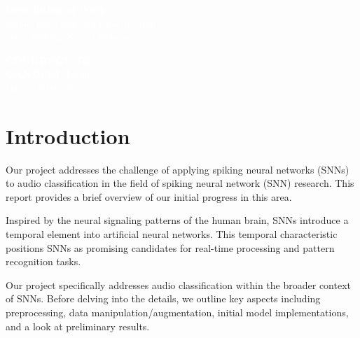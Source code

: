 \documentclass[11pt]{article}
\begin{document}
\pagecolor{darkbluegrey}
\afterpage{\nopagecolor}


\begin{titlepage}
    \begin{center}
        \textcolor{white}{\textbf{\Huge Description of Work}}\\ %
        \vspace{1cm}
        \textcolor{white}{\Large Sound Detection and Classification\\using Spiking Neural Networks} %
        \vspace{3cm}
    \end{center}
    \begin{center}
        \textcolor{white}{ %
            \textbf{COURREGE Téo}\\
            \textbf{GANDEEL Lo'aï}\\
            \vspace{1cm}
            \Large Date: \today}
    \end{center}
\end{titlepage}

\newpage

\tableofcontents

\pagebreak

\section{Introduction}

Our project addresses the challenge of applying spiking neural networks (SNNs) to audio classification in the field of spiking neural network (SNN) research. This report provides a brief overview of our initial progress in this area.

Inspired by the neural signaling patterns of the human brain, SNNs introduce a temporal element into artificial neural networks. This temporal characteristic positions SNNs as promising candidates for real-time processing and pattern recognition tasks.

Our project specifically addresses audio classification within the broader context of SNNs. Before delving into the details, we outline key aspects including preprocessing, data manipulation/augmentation, initial model implementations, and a look at preliminary results.
\end{document}
